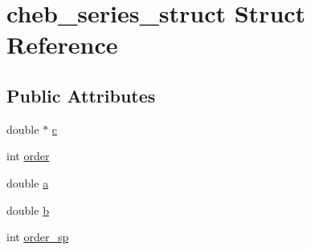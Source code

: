 \hypertarget{structcheb__series__struct}{\section{cheb\-\_\-series\-\_\-struct Struct Reference}
\label{structcheb__series__struct}
}
\subsection*{Public Attributes}
\begin{DoxyCompactItemize}
\item 
double $\ast$ \hyperlink{structcheb__series__struct_ac73ee88973d648e32584903f5661f6e5}{c}
\item 
int \hyperlink{structcheb__series__struct_afb77d588f75caf48fdb4a5fd17294989}{order}
\item 
double \hyperlink{structcheb__series__struct_aafe2f7b18fe3c9c9594f2a7ef9b17e14}{a}
\item 
double \hyperlink{structcheb__series__struct_ae1c3a9576879f0b9ce4b1d469f853d38}{b}
\item 
int \hyperlink{structcheb__series__struct_a3ead2944f44a9d8e263ec1bf3e9efc44}{order\-\_\-sp}
\end{DoxyCompactItemize}


